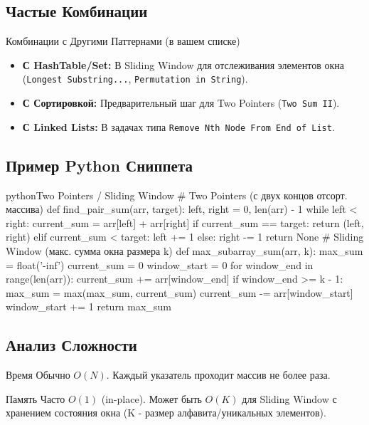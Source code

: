\subsection{Частые Комбинации}
\begin{myblock}{Комбинации с Другими Паттернами (в вашем списке)}
    \begin{itemize}[nosep, leftmargin=*]
        \item \textbf{С HashTable/Set:} В Sliding Window для отслеживания элементов окна (\texttt{Longest Substring...}, \texttt{Permutation in String}).
        \item \textbf{С Сортировкой:} Предварительный шаг для Two Pointers (\texttt{Two Sum II}).
        \item \textbf{С Linked Lists:} В задачах типа \texttt{Remove Nth Node From End of List}.
    \end{itemize}
\end{myblock}

\subsection{Пример Python Сниппета}
\begin{codebox}{python}{Two Pointers / Sliding Window}
# Two Pointers (с двух концов отсорт. массива)
def find_pair_sum(arr, target):
    left, right = 0, len(arr) - 1
    while left < right:
        current_sum = arr[left] + arr[right]
        if current_sum == target: return (left, right)
        elif current_sum < target: left += 1
        else: right -= 1
    return None
# Sliding Window (макс. сумма окна размера k)
def max_subarray_sum(arr, k):
    max_sum = float('-inf')
    current_sum = 0
    window_start = 0
    for window_end in range(len(arr)):
        current_sum += arr[window_end]
        if window_end >= k - 1:
            max_sum = max(max_sum, current_sum)
            current_sum -= arr[window_start]
            window_start += 1
    return max_sum
\end{codebox}

\subsection{Анализ Сложности}
\begin{myblock}{Время}
    Обычно $O(N)$. Каждый указатель проходит массив не более раза.
\end{myblock}
\begin{myblock}{Память}
    Часто $O(1)$ (in-place). Может быть $O(K)$ для Sliding Window с хранением состояния окна (K - размер алфавита/уникальных элементов).
\end{myblock}

